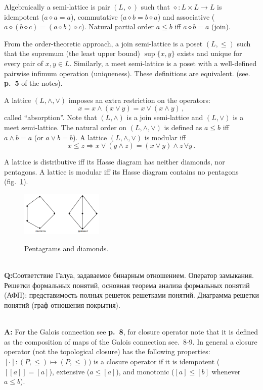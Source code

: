 \documentclass[a4paper]{article}
\newcommand{\rus}[1]{\foreignlanguage{russian}{#1}}
\begin{document}
Algebraically a semi-lattice is pair $(L, \diamond)$ such that $\diamond: L\times L \to L$
is idempotent ($a\diamond a=a$), commutative ($a \diamond b = b \diamond a$) and associative
($a \diamond (b \diamond c) = (a \diamond b) \diamond c$). Natural partial order $a\leq b$
iff $a\diamond b = a$ (join).

From the order-theoretic approach, a join semi-lattice is a poset $(L, \leq)$ such
that the supremum (the least upper bound) $\sup\{x, y\}$ exists and unique for every
pair of $x, y \in L$. Similarly, a meet semi-lattice is a poset with a well-defined
pairwise infimum operation (uniqueness). These definitions are equivalent. (see.
\textbf{p.~5} of the notes).

A lattice $(L, \wedge, \vee)$ imposes an extra restriction on the operators:
$$ x = x \wedge (x\vee y) = x \vee ( x\wedge y) \,, $$
called ``absorption''. Note that $(L, \wedge)$ is a join semi-lattice and $(L, \vee)$
is a meet semi-lattice. The natural order on $(L, \wedge, \vee)$ is defined as
$a\leq b$ iff $a\wedge b=a$ (or $a\vee b = b$). A lattice $(L, \wedge, \vee)$ is
modular iff
$$ x\leq z \Rightarrow x \vee (y\wedge z) = (x \vee y ) \wedge z\, \forall y\,. $$

A lattice is distributive iff its Hasse diagram has neither diamonds, nor pentagons.
A lattice is modular iff its Hasse diagram contains no pentagons (fig.~\ref{fig:lattice_pen_di}).
\begin{figure}
    \centering
    \includegraphics[width=0.35\textwidth]{pents_and_diamonds.png}
    \label{fig:lattice_pen_di}
    \caption{Pentagrams and diamonds.}
\end{figure}

\hfill\\\noindent\textbf{Q:}\rus{Соответствие Галуа, задаваемое бинарным отношением. Оператор
замыкания. Решетки формальных понятий, основная теорема анализа формальных понятий
(АФП): представимость полных решеток решетками понятий. Диаграмма решетки понятий
(граф отношения покрытия).}

\hfill\\\noindent\textbf{A:}
For the Galois connection see \textbf{p.~8}, for closure operator note that it is
defined as the composition of maps of the Galois connection see.~8-9. In general
a closure  operator (not the topological closure) has the following properties:
$[\cdot]: (P, \leq) \mapsto (P, \leq))$ is a closure operator if it is idempotent
($[[a]]=[a]$), extensive ($a\leq [a]$), and monotonic ($[a]\leq [b]$ whenever
$a\leq b$).
\end{document}
